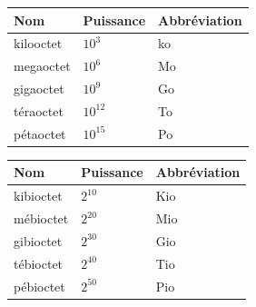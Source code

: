 \begin{frame}

\begin{center}


\medskip

\begin{tabular}{lll}
Nom&Puissance&Abbréviation\\
\hline
kilooctet&$10^3$&ko\\
megaoctet&$10^6$&Mo\\
gigaoctet&$10^9$&Go\\
téraoctet&$10^{12}$&To\\
pétaoctet&$10^{15}$&Po
\end{tabular}

\bigskip
\pause


\medskip

\begin{tabular}{lll}
Nom&Puissance&Abbréviation\\
\hline
kibioctet&$2^{10}$&Kio\\
mébioctet&$2^{20}$&Mio\\
gibioctet&$2^{30}$&Gio\\
tébioctet&$2^{40}$&Tio\\
pébioctet&$2^{50}$&Pio
\end{tabular}
\end{center}

\end{frame}





